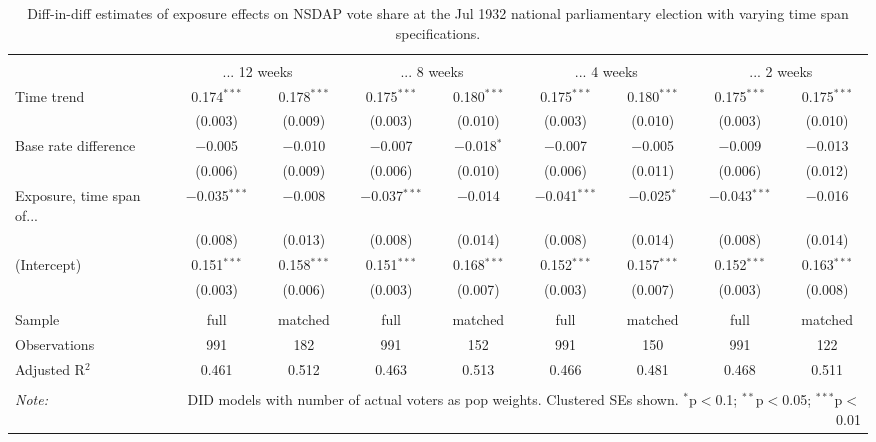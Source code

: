
\begin{table}[!htbp] \centering 
  \caption{Diff-in-diff estimates of exposure effects on NSDAP vote share at the Jul 1932 national parliamentary election with varying time span specifications.\vspace{-.25cm}} 
  \label{tab:nsdap-voteshare-timespan-dd-1932-1} 
\scriptsize 
\begin{tabular}{@{\extracolsep{5pt}}lcccccccc} 
\\[-1.8ex]\hline 
\hline \\[-1.8ex] 
 & \multicolumn{2}{c}{... 12 weeks} & \multicolumn{2}{c}{... 8 weeks} & \multicolumn{2}{c}{... 4 weeks} & \multicolumn{2}{c}{... 2 weeks} \\ 
 \cmidrule(r){2-3}\cmidrule(r){4-5}\cmidrule(r){6-7}\cmidrule(r){8-9}Time trend & 0.174$^{***}$ & 0.178$^{***}$ & 0.175$^{***}$ & 0.180$^{***}$ & 0.175$^{***}$ & 0.180$^{***}$ & 0.175$^{***}$ & 0.175$^{***}$ \\ 
  & (0.003) & (0.009) & (0.003) & (0.010) & (0.003) & (0.010) & (0.003) & (0.010) \\ 
  Base rate difference & $-$0.005 & $-$0.010 & $-$0.007 & $-$0.018$^{*}$ & $-$0.007 & $-$0.005 & $-$0.009 & $-$0.013 \\ 
  & (0.006) & (0.009) & (0.006) & (0.010) & (0.006) & (0.011) & (0.006) & (0.012) \\ 
  Exposure, time span of... & $-$0.035$^{***}$ & $-$0.008 & $-$0.037$^{***}$ & $-$0.014 & $-$0.041$^{***}$ & $-$0.025$^{*}$ & $-$0.043$^{***}$ & $-$0.016 \\ 
  & (0.008) & (0.013) & (0.008) & (0.014) & (0.008) & (0.014) & (0.008) & (0.014) \\ 
  (Intercept) & 0.151$^{***}$ & 0.158$^{***}$ & 0.151$^{***}$ & 0.168$^{***}$ & 0.152$^{***}$ & 0.157$^{***}$ & 0.152$^{***}$ & 0.163$^{***}$ \\ 
  & (0.003) & (0.006) & (0.003) & (0.007) & (0.003) & (0.007) & (0.003) & (0.008) \\ 
 \hline \\[-1.8ex] 
Sample & full & matched & full & matched & full & matched & full & matched \\ 
Observations & 991 & 182 & 991 & 152 & 991 & 150 & 991 & 122 \\ 
Adjusted R$^{2}$ & 0.461 & 0.512 & 0.463 & 0.513 & 0.466 & 0.481 & 0.468 & 0.511 \\ 
\hline 
\hline \\[-1.8ex] 
\textit{Note:}  & \multicolumn{8}{r}{DID models with number of actual voters as pop weights. Clustered SEs shown. $^{*}$p$<$0.1; $^{**}$p$<$0.05; $^{***}$p$<$0.01} \\ 
\end{tabular} 
\end{table} 

